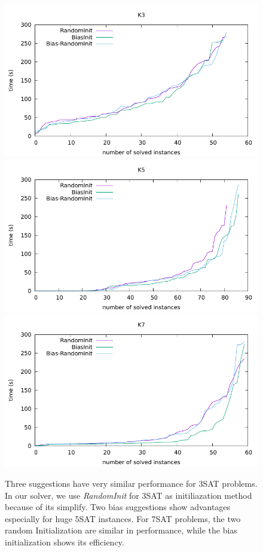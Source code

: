 \documentclass[12pt,a4paper,twoside]{scrartcl}
\numberwithin{equation}{section}
\begin{document}
\begin{figure}[H]
 \label{Experiment cactus}
  \includegraphics[scale =0.8]{DATA/K3/e1.pdf}
  \includegraphics[scale = 0.8]{DATA/K5/e1.pdf}
  \includegraphics[scale = 0.8]{DATA/K7/e1.pdf}
  \label{Experiment 1 k357 cactus plot}
  \caption{Three suggestions have very similar performance for 3SAT problems. In our solver, we use \emph{RandomInit} for 3SAT as initiliazation method because of its simplify. Two bias suggestions show advantages especially for huge 5SAT instances. For 7SAT problems, the two random Initialization are similar in performance, while the bias initialization shows its efficiency.}
\end{figure}
\clearpage
\end{document}

